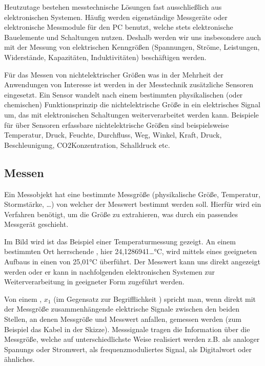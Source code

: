 \documentclass[letterpaper,10pt,english]{jupyterBook}
\begin{document}
\sphinxAtStartPar
Heutzutage bestehen messtechnische Lösungen fast ausschließlich aus elektronischen Systemen. Häufig werden eigenständige Messgeräte oder elektronische Messmodule für den PC benutzt, welche stets elektronische Bauelemente und Schaltungen nutzen. Deshalb werden wir uns insbesondere auch mit der Messung von elektrischen Kenngrößen (Spannungen, Ströme, Leistungen, Widerstände, Kapazitäten, Induktivitäten) beschäftigen werden.

\sphinxAtStartPar
Für das Messen von nicht\sphinxhyphen{}elektrischer Größen \sphinxhyphen{} was in der Mehrheit der Anwendungen von Interesse ist \sphinxhyphen{} werden in der Messtechnik zusätzliche Sensoren eingesetzt.
Ein Sensor wandelt nach einem bestimmten physikalischen (oder chemischen) Funktionsprinzip die nicht\sphinxhyphen{}elektrische Größe in ein elektrisches Signal um, das mit elektronischen Schaltungen weiterverarbeitet werden kann. Beispiele für über Sensoren erfassbare nicht\sphinxhyphen{}elektrische Größen sind beispielsweise Temperatur, Druck, Feuchte, Durchfluss, Weg, Winkel, Kraft, Druck, Beschleunigung, CO2\sphinxhyphen{}Konzentration, Schalldruck etc.


\subsection{Messen}
\label{\detokenize{content/0_Basics:messen}}
\sphinxAtStartPar


\sphinxAtStartPar
Ein Messobjekt hat eine bestimmte Messgröße (physikalische Größe, Temperatur, Stormstärke, …) von welcher der Messwert bestimmt werden soll. Hierfür wird ein Verfahren benötigt, um die Größe zu extrahieren, was durch ein passendes Messgerät geschieht.

\sphinxAtStartPar
Im Bild wird ist das Beispiel einer Temperaturmessung gezeigt. An einem bestimmten Ort herrschende , hier 24,1286941…°C, wird mittels eines geeigneten Aufbaus in einen  von 25,01°C überführt.
Der Messwert kann uns direkt angezeigt werden oder er kann in nachfolgenden elektronischen Systemen zur Weiterverarbeitung in geeigneter Form zugeführt werden.

\sphinxAtStartPar
Von einem , \(x_1\) (im Gegensatz zur Begrifflichkeit ) spricht man, wenn direkt mit der Messgröße zusammenhängende elektrische Signale zwischen den beiden Stellen, an denen Messgröße und Messwert anfallen, gemessen werden (zum Beispiel das Kabel in der Skizze). Messsignale tragen die Information über die Messgröße, welche auf unterschiedlichste Weise realisiert werden z.B. als analoger Spanungs\sphinxhyphen{} oder Stromwert, als frequenzmoduliertes Signal, als Digitalwort oder ähnliches.
\end{document}
